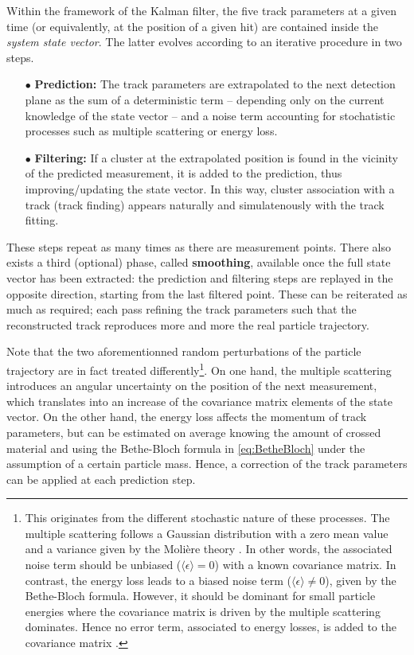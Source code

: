 Within the framework of the Kalman filter, the five track parameters at a given time (or equivalently, at the position of a given hit) are contained inside the \textit{system state vector}. The latter evolves according to an iterative procedure in two steps. 
\begin{itemize}
\item[$\bullet$] \textbf{Prediction:} The track parameters are extrapolated to the next detection plane as the sum of a deterministic term -- depending only on the current knowledge of the state vector -- and a noise term accounting for stochatistic processes such as multiple scattering or energy loss.
\item[$\bullet$] \textbf{Filtering:} If a cluster at the extrapolated position is found in the vicinity of the predicted measurement, it is added to the prediction, thus improving/updating the state vector. In this way, cluster association with a track (track finding) appears naturally and simulatenously with the track fitting.
\end{itemize}
These steps repeat as many times as there are measurement points. There also exists a third (optional) phase, called \textbf{smoothing}, available once the full state vector has been extracted: the prediction and filtering steps are replayed in the opposite direction, starting from the last filtered point. These can be reiterated as much as required; each pass refining the track parameters such that the reconstructed track reproduces more and more the real particle trajectory.

Note that the two aforementionned random perturbations of the particle trajectory are in fact treated differently\footnote{This originates from the different stochastic nature of these processes. The multiple scattering follows a Gaussian distribution with a zero mean value and a variance given by the Molière theory \cite{particledatagroupReviewParticlePhysics2022}. In other words, the associated noise term should be unbiased ($\langle \epsilon \rangle = 0 $) with a known covariance matrix. In contrast, the energy loss leads to a biased noise term ($\langle \epsilon \rangle \neq 0 $), given by the Bethe-Bloch formula. However, it should be dominant for small particle energies where the covariance matrix is driven by the multiple scattering dominates. Hence no error term, associated to energy losses, is added to the covariance matrix \cite{mankelPatternRecognitionEvent2004}.}. On one hand, the multiple scattering introduces an angular uncertainty on the position of the next measurement, which translates into an increase of the covariance matrix elements of the state vector. On the other hand, the energy loss affects the momentum of track parameters, but can be estimated on average knowing the amount of crossed material and using the Bethe-Bloch formula in \eq\ref{eq:BetheBloch} under the assumption of a certain particle mass. Hence, a \dEdx correction of the track parameters can be applied at each prediction step. \\

